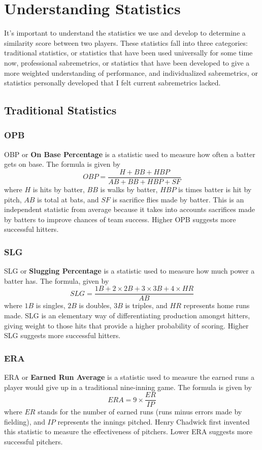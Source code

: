 \documentclass[12pt]{article}
\numberwithin{equation}{subsection}
\begin{document}
\section{Understanding Statistics}
It's important to understand the statistics we use and develop to determine a similarity score between two players. These statistics fall into three categories: traditional statistics, or statistics that have been used universally for some time now, professional sabremetrics, or statistics that have been developed to give a more weighted understanding of performance, and individualized sabremetrics, or statistics personally developed that I felt current sabremetrics lacked.

\subsection{Traditional Statistics}
\subsubsection{OPB}
OBP or \textbf{On Base Percentage} is a statistic used to measure how often a batter gets on base. The formula is given by
\begin{equation}
	OBP = \frac{H + BB + HBP}{AB + BB + HBP + SF}
\end{equation}
where $H$ is hits by batter, $BB$ is walks by batter, $HBP$ is times batter is hit by pitch, $AB$ is total at bats, and $SF$ is sacrifice flies made by batter. This is an independent statistic from average because it takes into accounts sacrifices made by batters to improve chances of team success. Higher OPB suggests more successful hitters.

\subsubsection{SLG}
SLG or \textbf{Slugging Percentage} is a statistic used to measure how much power a batter has. The formula, given by
\begin{equation}
	SLG = \frac{1B + 2\times 2B + 3\times 3B + 4\times HR}{AB}
\end{equation}
where $1B$ is singles, $2B$ is doubles, $3B$ is triples, and $HR$ represents home runs made. SLG is an elementary way of differentiating production amongst hitters, giving weight to those hits that provide a higher probability of scoring. Higher SLG suggests more successful hitters.

\subsubsection{ERA}
ERA or \textbf{Earned Run Average} is a statistic used to measure the earned runs a player would give up in a traditional nine-inning game. The formula is given by
\begin{equation}
	ERA = 9 \times \frac{ER}{IP}
\end{equation}
where $ER$ stands for the number of earned runs (runs minus errors made by fielding), and $IP$ represents the innings pitched. Henry Chadwick first invented this statistic to measure the effectiveness of pitchers. Lower ERA suggests more successful pitchers.
\end{document}
